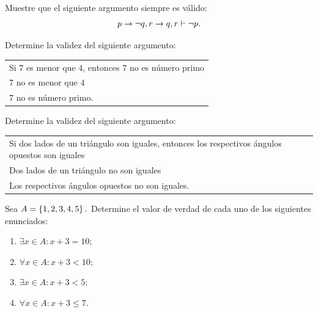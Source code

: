 \begin{problema}
  Muestre que el siguiente argumento siempre es válido:
 $$
 p \rightarrow \neg q, r \rightarrow q, r \vdash \neg p.
 $$
\end{problema}




 \begin{problema}
  Determine la validez del siguiente argumento:
  \begin{center}
\begin{tabular}{l}
Si $7$ es menor que $4$, entonces $7$ no es número primo\\
$7$ no es menor que $4$\\\hline
$7$ no es número primo.
  \end{tabular}
  \end{center}

 \end{problema}




 \begin{problema}
  Determine la validez del siguiente argumento:
  \begin{center}
\begin{tabular}{l}
Si dos lados de un triángulo son iguales, entonces los respectivos ángulos opuestos son iguales\\
Dos lados de un triángulo no son iguales\\\hline
Los respectivos ángulos opuestos no son iguales.
  \end{tabular}
  \end{center}

 \end{problema}





 \begin{problema}
  Sea $A=\left\{ 1,2,3,4,5 \right\}.$ Determine el valor de verdad de cada uno de los siguientes enunciados:
  \begin{enumerate}
   \item $\exists x \in A: x+3=10;$ 
   \item $\forall x \in A: x+3<10;$ 
   \item $\exists x \in A: x+3<5;$ 
   \item $\forall x \in A: x+3 \leq 7.$
  \end{enumerate}

 \end{problema}




